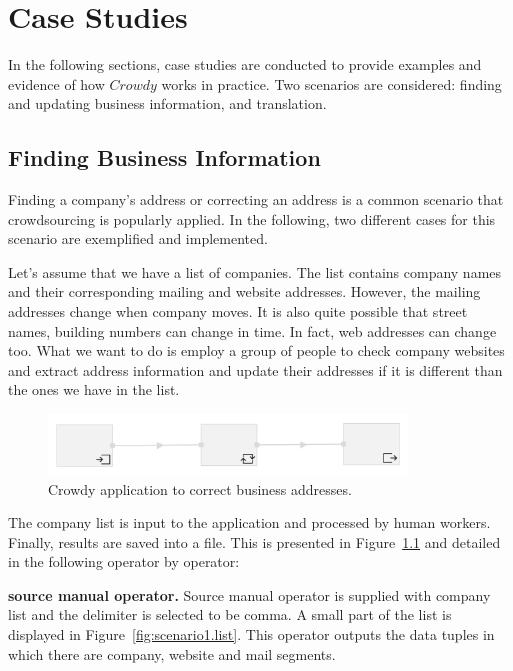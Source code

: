 \chapter{Case Studies}
\label{chap:examples}

In the following sections, case studies are conducted to provide examples 
and evidence of how $Crowdy$ works in practice. Two scenarios are considered: 
finding and updating business information, and translation.

\section{Finding Business Information}
Finding a company's address or correcting an address is a common scenario that crowdsourcing is popularly applied. In the following, two different cases for this scenario are exemplified and implemented.

Let's assume that we have a list of companies. The list contains company names and their corresponding mailing and website addresses. However, the mailing addresses change when company moves. It is also quite possible that street names, building numbers can change in time. In fact, web addresses can change too. What we want to do is employ a group of people to check company websites and extract address information and update their addresses if it is different than the ones we have in the list.

\begin{figure}[ht]
	\centering
	\includegraphics[width=0.85\textwidth]{figures/scenarios/naive.png}
	\caption{Crowdy application to correct business addresses.}
	\label{fig:scenario1}
\end{figure}

The company list is input to the application and processed by human workers. Finally, results are saved into a file. This is presented in Figure~\ref{fig:scenario1} and detailed in the following operator by operator:

\textbf{source manual operator.}
Source manual operator is supplied with company list and the delimiter is selected to be comma. A small part of the list is displayed in Figure~\ref{fig:scenario1.list}. This operator outputs the data tuples in which there are company, website and mail segments.

